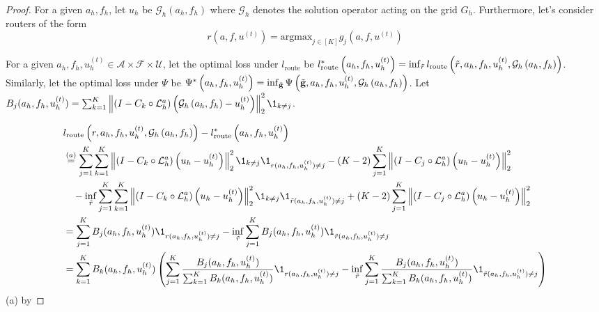 \documentclass{article} %
\begin{document}
\begin{proof}

For a given $a_h, f_h$, let $u_h$ be $\mathcal{G}_h\left(a_h, f_h\right)$ where $\mathcal{G}_h$ denotes the solution operator acting on the grid $G_h$. Furthermore, let's consider routers of the form $$r(a, f, u^{(t)}) = \text{argmax}_{j \in [K]} g_j(a, f, u^{(t)})$$

For a given $a_h, f_h, u_h^{(t)} \in \mathcal{A} \times \mathcal{F} \times \mathcal{U}$, let the optimal loss under $l_{\text{route}}$ be $l_{\text{route}}^*\left(a_h, f_h, u^{(t)}_h\right) = \inf_{\Tilde{r}} l_{\text{route}}\left(\tilde{r}, a_h, f_h, u^{(t)}_h, \mathcal{G}_h\left(a_h, f_h\right)\right)$. Similarly, let the optimal loss under $\Psi$ be $\Psi^*\left(a_h, f_h, u^{(t)}_h\right) = \inf_{\Tilde{\mathbf{g}}} \Psi\left(\tilde{\mathbf{g}}, a_h, f_h, u^{(t)}_h, \mathcal{G}_h\left(a_h, f_h\right)\right)$. Let $B_j(a_h, f_h, u^{(t)}_h) = \sum_{k = 1}^K\left\|\left( I - C_{k} \circ \mathcal{L}_{h}^a\right)\left(\mathcal{G}_h\left(a_h, f_h\right) - u^{(t)}_h\right)\right\|^2_2\1_{k\neq j}$.

\begin{align*}
    &l_{\text{route}}\left(r, a_h, f_h, u^{(t)}_h, \mathcal{G}_h\left(a_h, f_h\right)\right) - l_{\text{route}}^*\left(a_h, f_h, u^{(t)}_h\right) \\
    &\overset{(a)}{=} \sum_{j = 1}^K\sum_{k = 1}^K\left\|\left( I - C_{k} \circ \mathcal{L}_{h}^a\right)\left(u_h - u^{(t)}_h\right)\right\|^2_2\1_{k\neq j}\1_{r(a_h, f_h, u^{(t)}_h) \neq j}  -\left(K - 2\right)\sum_{j = 1}^K\left\|\left( I - C_{j} \circ \mathcal{L}_{h}^a\right)\left(u_h - u^{(t)}_h\right)\right\|^2_2 \\
    &\quad- \inf_{\Tilde{r}} \sum_{j = 1}^K\sum_{k = 1}^K\left\|\left( I - C_{k} \circ \mathcal{L}_{h}^a\right)\left(u_h - u^{(t)}_h\right)\right\|^2_2\1_{k\neq j}\1_{\tilde{r}(a_h, f_h, u^{(t)}_h) \neq j}  +\left(K - 2\right)\sum_{j = 1}^K\left\|\left( I - C_{j} \circ \mathcal{L}_{h}^a\right)\left(u_h - u^{(t)}_h\right)\right\|^2_2 \\
    &= \sum_{j = 1}^K B_j(a_h, f_h, u^{(t)}_h)\1_{r(a_h, f_h, u^{(t)}_h) \neq j} - \inf_{\Tilde{r}} \sum_{j = 1}^KB_j(a_h, f_h, u^{(t)}_h)\1_{\tilde{r}(a_h, f_h, u^{(t)}_h) \neq j}  \\
    &= \sum_{k = 1}^K B_k(a_h, f_h, u^{(t)}_h)\left(\sum_{j = 1}^K \frac{B_j(a_h, f_h, u^{(t)}_h)}{\sum_{k = 1}^K B_k(a_h, f_h, u^{(t)}_h)}\1_{r(a_h, f_h, u^{(t)}_h) \neq j} - \inf_{\Tilde{r}} \sum_{j = 1}^K \frac{B_j(a_h, f_h, u^{(t)}_h)}{ \sum_{k = 1}^K B_k(a_h, f_h, u^{(t)}_h)}\1_{\tilde{r}(a_h, f_h, u^{(t)}_h) \neq j}\right)
\end{align*}
(a) by 


\end{proof}
\end{document}
